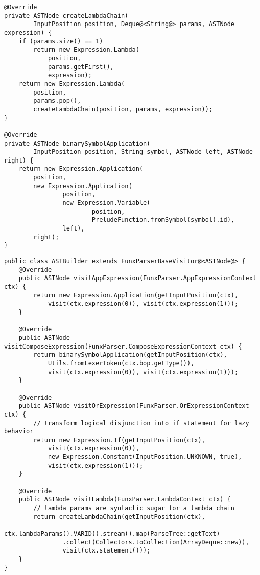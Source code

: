 \begin{lstlisting}[caption={Metodi per astrazioni annidate e operatori simbolici binari}, style=javaCode, label={lst:5-6-auxiliary-methods-java}]
@Override
private ASTNode createLambdaChain(
        InputPosition position, Deque@<String@> params, ASTNode expression) {
    if (params.size() == 1)
        return new Expression.Lambda(
            position,
            params.getFirst(),
            expression);
    return new Expression.Lambda(
        position,
        params.pop(),
        createLambdaChain(position, params, expression));
}

@Override
private ASTNode binarySymbolApplication(
        InputPosition position, String symbol, ASTNode left, ASTNode right) {
    return new Expression.Application(
        position,
        new Expression.Application(
                position,
                new Expression.Variable(
                        position,
                        PreludeFunction.fromSymbol(symbol).id),
                left),
        right);
}
\end{lstlisting}
\vspace{4mm}
\begin{lstlisting}[caption={Alcuni metodi \textit{visit} di \texttt{ASTBuilder}}, style=javaCode, label={lst:5-6-astbuilder-java}]
public class ASTBuilder extends FunxParserBaseVisitor@<ASTNode@> {
    @Override
    public ASTNode visitAppExpression(FunxParser.AppExpressionContext ctx) {
        return new Expression.Application(getInputPosition(ctx),
            visit(ctx.expression(0)), visit(ctx.expression(1)));
    }

    @Override
    public ASTNode visitComposeExpression(FunxParser.ComposeExpressionContext ctx) {
        return binarySymbolApplication(getInputPosition(ctx),
            Utils.fromLexerToken(ctx.bop.getType()),
            visit(ctx.expression(0)), visit(ctx.expression(1)));
    }
    
    @Override
    public ASTNode visitOrExpression(FunxParser.OrExpressionContext ctx) {
        // transform logical disjunction into if statement for lazy behavior
        return new Expression.If(getInputPosition(ctx),
            visit(ctx.expression(0)),
            new Expression.Constant(InputPosition.UNKNOWN, true),
            visit(ctx.expression(1)));
    }

    @Override
    public ASTNode visitLambda(FunxParser.LambdaContext ctx) {
        // lambda params are syntactic sugar for a lambda chain
        return createLambdaChain(getInputPosition(ctx),
            ctx.lambdaParams().VARID().stream().map(ParseTree::getText)
                .collect(Collectors.toCollection(ArrayDeque::new)),
                visit(ctx.statement()));
    }
}    
\end{lstlisting}

